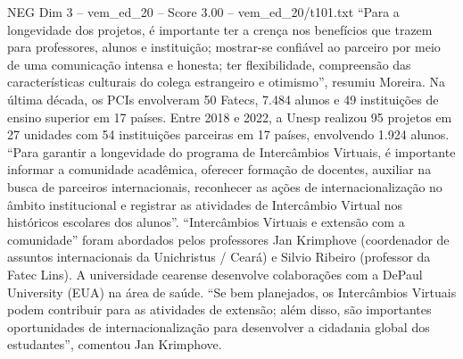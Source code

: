 \begin{textsample}{NEG Dim 3 – vem\_ed\_20 – Score 3.00 – vem\_ed\_20/t101.txt}  \label{ex:f3_neg_116}
“Para a longevidade dos projetos, é importante ter a crença nos benefícios que trazem para professores, alunos e instituição; mostrar-se confiável ao parceiro por meio de uma comunicação intensa e honesta; ter flexibilidade, compreensão das características culturais do colega estrangeiro e otimismo”, resumiu Moreira.
Na última década, os PCIs envolveram 50 Fatecs, 7.484 alunos e 49 instituições de ensino superior em 17 países.
Entre 2018 e 2022, a Unesp realizou 95 projetos em 27 unidades com 54 instituições parceiras em 17 países, envolvendo 1.924 alunos. “Para garantir a longevidade do programa de Intercâmbios Virtuais, é importante informar a comunidade acadêmica, oferecer formação de docentes, auxiliar na busca de parceiros internacionais, reconhecer as ações de internacionalização no âmbito institucional e registrar as atividades de Intercâmbio Virtual nos históricos escolares dos alunos”. “Intercâmbios Virtuais e extensão com a comunidade” foram abordados pelos professores Jan Krimphove (coordenador de assuntos internacionais da Unichristus / Ceará) e Silvio Ribeiro (professor da Fatec Lins).
A universidade cearense desenvolve colaborações com a DePaul University (EUA) na área de saúde. “Se bem planejados, os Intercâmbios Virtuais podem contribuir para as atividades de extensão; além disso, são importantes oportunidades de internacionalização para desenvolver a cidadania global dos estudantes”, comentou Jan Krimphove.

\end{textsample}
